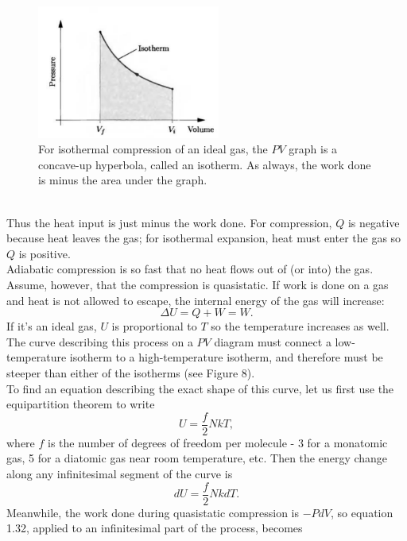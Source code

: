 \documentclass[11pt]{exam}
\begin{document}
\begin{figure}[htp]
    \centering
    \includegraphics[width=6cm]{figure7.png}
    \caption{For isothermal compression of an ideal gas, the $PV$ graph is a concave-up hyperbola, called an isotherm. As always, the work done is minus the area under the graph.}
\label{fig:isotherm}
\end{figure}\\
Thus the heat input is just minus the work done. For compression, $Q$ is negative because heat leaves the gas; for isothermal expansion, heat must enter the gas so $Q$ is positive.\\
\hspace*{10mm}Adiabatic compression is so fast that no heat flows out of (or into) the gas. Assume, however, that the compression is quasistatic. 
\newpage
\hspace*{10mm}If work is done on a gas and heat is not allowed to escape, the internal energy of the gas will increase:
\begin{equation}\tag{1.32}
\Delta U = Q+W=W.    
\end{equation}
If it's an ideal gas, $U$ is proportional to $T$ so the temperature increases as well. The curve describing this process on a $PV$ diagram must connect a low-temperature isotherm to a high-temperature isotherm, and therefore must be steeper than either of the isotherms (see Figure 8). \\
\hspace*{10mm}To find an equation describing the exact shape of this curve, let us first use the equipartition theorem to write
\begin{equation}\tag{1.33}
U=\frac{f}{2}NkT,    
\end{equation}
where $f$ is the number of degrees of freedom per molecule - 3 for a monatomic gas, 5 for a diatomic gas near room temperature, etc. Then the energy change along any infinitesimal segment of the curve is 
\begin{equation}\tag{1.34}
dU=\frac{f}{2}NkdT.    
\end{equation}
Meanwhile, the work done during quasistatic compression is $-PdV$, so equation 1.32, applied to an infinitesimal part of the process, becomes
\end{document}
